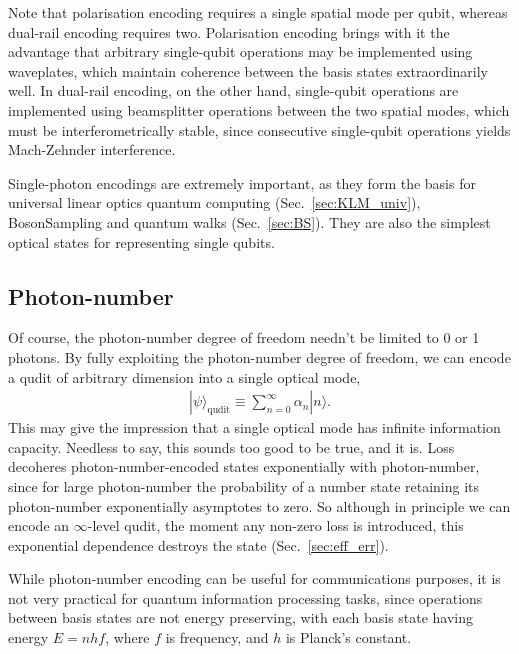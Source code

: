 \documentclass[aps,rmp,twocolumn,amsmath,amssymb,nofootinbib,superscriptaddress]{revtex4}
\newcommand{\ket}[1]{|#1\rangle}
\begin{document}
Note that polarisation encoding requires a single spatial mode per qubit, whereas dual-rail encoding requires two. Polarisation encoding brings with it the advantage that arbitrary single-qubit operations may be implemented using waveplates, which maintain coherence between the basis states extraordinarily well. In dual-rail encoding, on the other hand, single-qubit operations are implemented using beamsplitter operations between the two spatial modes, which must be interferometrically stable, since consecutive single-qubit operations yields Mach-Zehnder interference.

Single-photon encodings are extremely important, as they form the basis for universal linear optics quantum computing (Sec.~\ref{sec:KLM_univ}), {\sc BosonSampling} and quantum walks (Sec.~\ref{sec:BS}). They are also the simplest optical states for representing single qubits.

%
%

\subsection{Photon-number}

Of course, the photon-number degree of freedom needn't be limited to 0 or 1 photons. By fully exploiting the photon-number degree of freedom, we can encode a qudit of arbitrary dimension into a single optical mode,
\begin{align} \label{eq:number_qudit}
\ket\psi_\mathrm{qudit} \equiv \sum_{n=0}^\infty \alpha_n \ket{n}.
\end{align}
This may give the impression that a single optical mode has infinite information capacity. Needless to say, this sounds too good to be true, and it is. Loss decoheres photon-number-encoded states exponentially with photon-number, since for large photon-number the probability of a number state retaining its photon-number exponentially asymptotes to zero. So although in principle we can encode an $\infty$-level qudit, the moment any non-zero loss is introduced, this exponential dependence destroys the state (Sec.~\ref{sec:eff_err}).

While photon-number encoding can be useful for communications purposes, it is not very practical for quantum information processing tasks, since operations between basis states are not energy preserving, with each basis state having energy \mbox{$E=nhf$}, where $f$ is frequency, and $h$ is Planck's constant.

%
%
\end{document}
